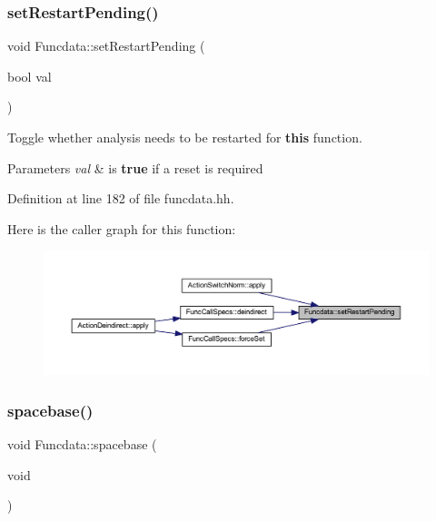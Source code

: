 \subsubsection{\texorpdfstring{setRestartPending()}{setRestartPending()}}
{\footnotesize\ttfamily void Funcdata\+::set\+Restart\+Pending (\begin{DoxyParamCaption}\item[{bool}]{val }\end{DoxyParamCaption})\hspace{0.3cm}{\ttfamily [inline]}}



Toggle whether analysis needs to be restarted for {\bfseries{this}} function. 


\begin{DoxyParams}{Parameters}
{\em val} & is {\bfseries{true}} if a reset is required \\
\hline
\end{DoxyParams}


Definition at line 182 of file funcdata.\+hh.

Here is the caller graph for this function\+:
\nopagebreak
\begin{figure}[H]
\begin{center}
\leavevmode
\includegraphics[width=350pt]{class_funcdata_af21c852eb9f606c5cd19fb2456927ecd_icgraph}
\end{center}
\end{figure}
\mbox{\label{class_funcdata_a96433773ee0126ce9a25b0970a6ef513}} 
\subsubsection{\texorpdfstring{spacebase()}{spacebase()}}
{\footnotesize\ttfamily void Funcdata\+::spacebase (\begin{DoxyParamCaption}\item[{void}]{ }\end{DoxyParamCaption})}



